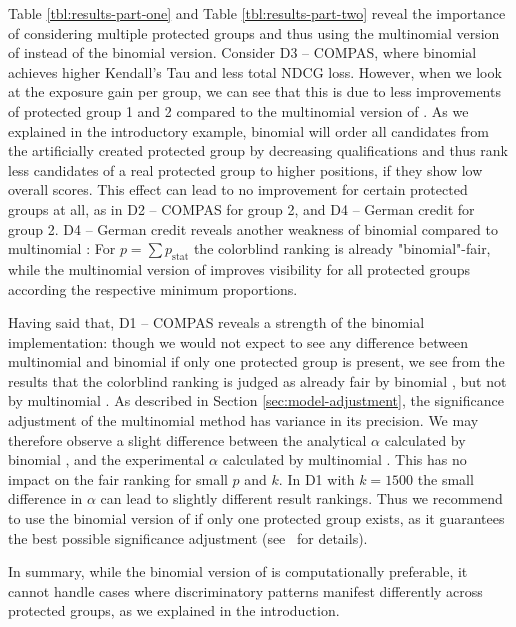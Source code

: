  Table \ref{tbl:results-part-one} and Table \ref{tbl:results-part-two} reveal the importance of considering multiple protected groups and thus using the multinomial version of \algoFAIR instead of the binomial version. 
%
Consider D3 -- COMPAS, where binomial \algoFAIR achieves higher Kendall's Tau and less total NDCG loss. 
%
However, when we look at the exposure gain per group, we can see that this is due to less improvements of protected group 1 and 2 compared to the multinomial version of \algoFAIR. 
%
As we explained in the introductory example, binomial \algoFAIR will order all candidates from the artificially created protected group by decreasing qualifications and thus rank less candidates of a real protected group to higher positions, if they show low overall scores.
%
This effect can lead to no improvement for certain protected groups at all, as in D2 -- COMPAS for group 2, and D4 -- German credit for group 2. 
%
D4 -- German credit reveals another weakness of binomial \algoFAIR compared to multinomial \algoFAIR: For $p=\sum p_{\text{stat}}$ the colorblind ranking is already "binomial"-fair, while the multinomial version of \algoFAIR improves visibility for all protected groups according the respective minimum proportions. 

Having said that, D1 -- COMPAS reveals a strength of the binomial \algoFAIR implementation: though we would not expect to see any difference between multinomial \algoFAIR and binomial \algoFAIR if only one protected group is present, we see from the results that the colorblind ranking is judged as already fair by binomial \algoFAIR, but not by multinomial \algoFAIR. 
%
As described in Section \ref{sec:model-adjustment}, the significance adjustment of the multinomial method has variance in its precision. 
%
We may therefore observe a slight difference between the analytical $\alpha$ calculated by binomial \algoFAIR, and the experimental $\alpha$ calculated by multinomial \algoFAIR.
%
This has no impact on the fair ranking for small $p$ and $k$. 
%
In D1 with $k=1500$ the small difference in $\alpha$ can lead to slightly different result rankings. 
%
Thus we recommend to use the binomial version of \algoFAIR if only one protected group exists, as it guarantees the best possible significance adjustment (see~\citet{zehlike2020note} for details).

In summary, while the binomial version of \algoFAIR is computationally preferable, it cannot handle cases where discriminatory patterns manifest differently across protected groups, as we explained in the introduction. 


